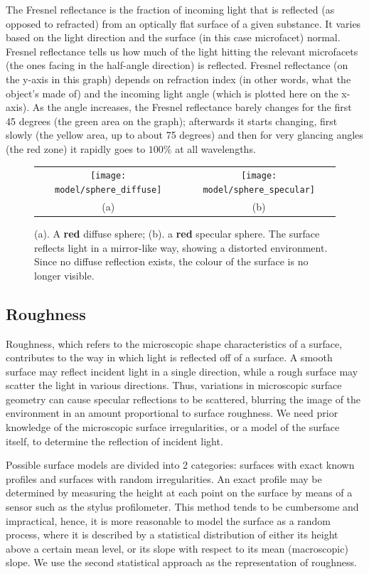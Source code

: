 The Fresnel reflectance is the fraction of incoming light that is reflected (as opposed to refracted) from an optically flat surface of a given substance. It varies based on the light direction and the surface (in this case microfacet) normal. Fresnel reflectance tells us how much of the light hitting the relevant microfacets (the ones facing in the half-angle direction) is reflected. Fresnel reflectance (on the y-axis in this graph) depends on refraction index (in other words, what the object’s made of) and the incoming light angle (which is plotted here on the x-axis). As the angle increases, the Fresnel reflectance barely changes for the first 45 degrees (the green area on the graph); afterwards it starts changing, first slowly (the yellow area, up to about 75 degrees) and then for very glancing angles (the red zone) it rapidly goes to $100\%$ at all wavelengths.
\begin{figure}[!htbp]
\centering
\begin{tabular}{cc}
\texttt{[image: model/sphere\_diffuse]}&
\texttt{[image: model/sphere\_specular]}\\
(a) & (b)\\
\end{tabular}
\caption{(a). A \textbf{red} diffuse sphere; (b). a \textbf{red} specular sphere. The surface reflects light in a mirror-like way, showing a distorted environment. Since no diffuse reflection exists, the colour of the surface is no longer visible.}
\label{fig:spec_ref}
\end{figure}

\subsection{Roughness}
Roughness, which refers to the microscopic shape characteristics of a surface, contributes to the way in which light is reflected off of a surface. A smooth surface may reflect incident light in a single direction, while a rough surface may scatter the light in various directions. Thus, variations in microscopic surface geometry can cause specular reflections to be scattered, blurring the image of the environment in an amount proportional to surface roughness. We need prior knowledge of the microscopic surface irregularities, or a model of the surface itself, to determine the reflection of incident light.

Possible surface models are divided into 2 categories: surfaces with exact known profiles and surfaces with random irregularities. An exact profile may be determined by measuring the height at each point on the surface by means of a sensor such as the stylus profilometer. This method tends to be cumbersome and impractical, hence, it is more reasonable to model the surface as a random process, where it is described by a statistical distribution of either its height above a certain mean level, or its slope with respect to its mean (macroscopic) slope. We use the second statistical approach as the representation of roughness.

